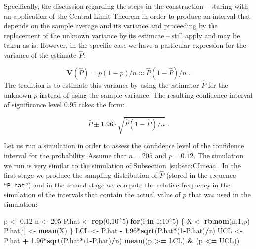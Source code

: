\documentclass[
]{krantz}
\makeatletter
\newenvironment{Shaded}{\begin{snugshade}}{\end{snugshade}}
\newcommand{\ControlFlowTok}[1]{\textcolor[rgb]{0.13,0.29,0.53}{\textbf{#1}}}
\newcommand{\DecValTok}[1]{\textcolor[rgb]{0.00,0.00,0.81}{#1}}
\newcommand{\FloatTok}[1]{\textcolor[rgb]{0.00,0.00,0.81}{#1}}
\newcommand{\KeywordTok}[1]{\textcolor[rgb]{0.13,0.29,0.53}{\textbf{#1}}}
\newcommand{\NormalTok}[1]{#1}
\newcommand{\OperatorTok}[1]{\textcolor[rgb]{0.81,0.36,0.00}{\textbf{#1}}}
\newcommand{\StringTok}[1]{\textcolor[rgb]{0.31,0.60,0.02}{#1}}
\newcommand{\Var}{\mathbf{V}}
\newenvironment{kframe}{%
\medskip{}
\setlength{\fboxsep}{.8em}
 \def\at@end@of@kframe{}%
 \ifinner\ifhmode%
  \def\at@end@of@kframe{\end{minipage}}%
  \begin{minipage}{\columnwidth}%
 \fi\fi%
 \def\FrameCommand##1{\hskip\@totalleftmargin \hskip-\fboxsep
 \colorbox{shadecolor}{##1}\hskip-\fboxsep
     \hskip-\linewidth \hskip-\@totalleftmargin \hskip\columnwidth}%
 \MakeFramed {\advance\hsize-\width
   \@totalleftmargin\z@ \linewidth\hsize
   \@setminipage}}%
 {\par\unskip\endMakeFramed%
 \at@end@of@kframe}
\renewenvironment{Shaded}{\begin{kframe}}{\end{kframe}}
\theoremstyle{definition}
\theoremstyle{definition}
\theoremstyle{definition}
\theoremstyle{remark}
\makeatother
\begin{document}
Specifically, the discussion regarding the steps in the construction --
staring with an application of the Central Limit Theorem in order to
produce an interval that depends on the sample average and its variance
and proceeding by the replacement of the unknown variance by its
estimate -- still apply and may be taken as is. However, in the specific
case we have a particular expression for the variance of the estimate
\(\hat P\):

\[\Var(\hat P) = p(1-p)/n \approx \hat P(1- \hat P) /n\;.\]
The tradition is to estimate this variance by using the estimator
\(\hat P\) for the unknown \(p\) instead of using the sample variance. The
resulting confidence interval of significance level 0.95 takes the form:

\[\bar P \pm 1.96 \cdot\sqrt{ \hat P(1-\hat P)/n}\;.\]

Let us run a simulation in order to assess the confidence level of the
confidence interval for the probability. Assume that \(n=205\) and
\(p=0.12\). The simulation we run is very similar to the simulation of
Subsection~\ref{subsec:CImean}. In the first stage we produce the
sampling distribution of \(\hat P\) (stored in the sequence ``\texttt{P.hat}'') and
in the second stage we compute the relative frequency in the simulation
of the intervals that contain the actual value of \(p\) that was used in
the simulation:

\begin{Shaded}
\begin{Highlighting}[]
\NormalTok{p <-}\StringTok{ }\FloatTok{0.12}
\NormalTok{n <-}\StringTok{ }\DecValTok{205}
\NormalTok{P.hat <-}\StringTok{ }\KeywordTok{rep}\NormalTok{(}\DecValTok{0}\NormalTok{,}\DecValTok{10}\OperatorTok{^}\DecValTok{5}\NormalTok{)}
\ControlFlowTok{for}\NormalTok{(i }\ControlFlowTok{in} \DecValTok{1}\OperatorTok{:}\DecValTok{10}\OperatorTok{^}\DecValTok{5}\NormalTok{) \{}
\NormalTok{  X <-}\StringTok{ }\KeywordTok{rbinom}\NormalTok{(n,}\DecValTok{1}\NormalTok{,p)}
\NormalTok{  P.hat[i] <-}\StringTok{ }\KeywordTok{mean}\NormalTok{(X)}
\NormalTok{\}}
\NormalTok{LCL <-}\StringTok{ }\NormalTok{P.hat }\OperatorTok{-}\StringTok{ }\FloatTok{1.96}\OperatorTok{*}\KeywordTok{sqrt}\NormalTok{(P.hat}\OperatorTok{*}\NormalTok{(}\DecValTok{1}\OperatorTok{-}\NormalTok{P.hat)}\OperatorTok{/}\NormalTok{n)}
\NormalTok{UCL <-}\StringTok{ }\NormalTok{P.hat }\OperatorTok{+}\StringTok{ }\FloatTok{1.96}\OperatorTok{*}\KeywordTok{sqrt}\NormalTok{(P.hat}\OperatorTok{*}\NormalTok{(}\DecValTok{1}\OperatorTok{-}\NormalTok{P.hat)}\OperatorTok{/}\NormalTok{n)}
\KeywordTok{mean}\NormalTok{((p }\OperatorTok{>=}\StringTok{ }\NormalTok{LCL) }\OperatorTok{&}\StringTok{ }\NormalTok{(p }\OperatorTok{<=}\StringTok{ }\NormalTok{UCL))}
\end{Highlighting}
\end{Shaded}
\end{document}
